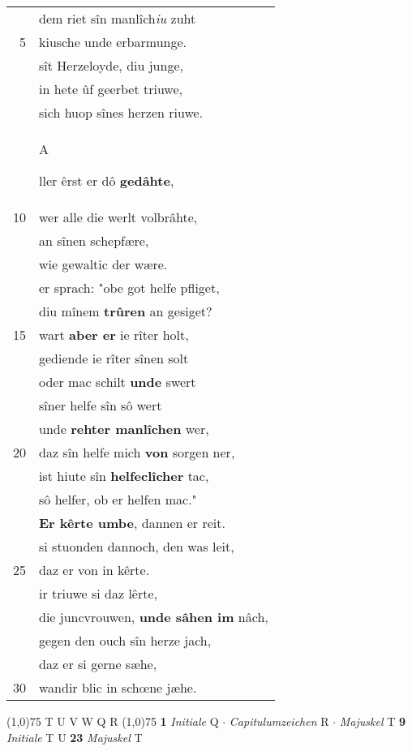 \documentclass[8pt,a4paper,notitlepage]{article}
\begin{document}
\begin{table}[ht]
\begin{minipage}[t]{0.5\linewidth}
\begin{tabular}{rl}
 & dem riet sîn manlîch\textit{iu} zuht\\ 
5 & kiusche unde erbarmunge.\\ 
 & sît Herzeloyde, diu junge,\\ 
 & in hete ûf geerbet triuwe,\\ 
 & sich huop sînes herzen riuwe.\\ 
 & \begin{large}A\end{large}ller êrst er dô \textbf{gedâhte},\\ 
10 & wer alle die werlt volbrâhte,\\ 
 & an sînen schepfære,\\ 
 & wie gewaltic der wære.\\ 
 & er sprach: "obe got helfe pfliget,\\ 
 & diu mînem \textbf{trûren} an gesiget?\\ 
15 & wart \textbf{aber er} ie rîter holt,\\ 
 & gediende ie rîter sînen solt\\ 
 & oder mac schilt \textbf{unde} swert\\ 
 & sîner helfe sîn sô wert\\ 
 & unde \textbf{rehter manlîchen} wer,\\ 
20 & daz sîn helfe mich \textbf{von} sorgen ner,\\ 
 & ist hiute sîn \textbf{helfeclîcher} tac,\\ 
 & sô helfer, ob er helfen mac."\\ 
 & \textbf{Er kêrte umbe}, dannen er reit.\\ 
 & si stuonden dannoch, den was leit,\\ 
25 & daz er von in kêrte.\\ 
 & ir triuwe si daz lêrte,\\ 
 & die juncvrouwen, \textbf{unde sâhen im} nâch,\\ 
 & gegen den ouch sîn herze jach,\\ 
 & daz er si gerne sæhe,\\ 
30 & wandir blic in schœne jæhe.\\ 
\end{tabular}
\scriptsize
\line(1,0){75} \newline
T U V W Q R \newline
\line(1,0){75} \newline
\textbf{1} \textit{Initiale} Q   $\cdot$ \textit{Capitulumzeichen} R   $\cdot$ \textit{Majuskel} T  \textbf{9} \textit{Initiale} T U  \textbf{23} \textit{Majuskel} T  \newline

\end{minipage}
\end{table}
\end{document}
